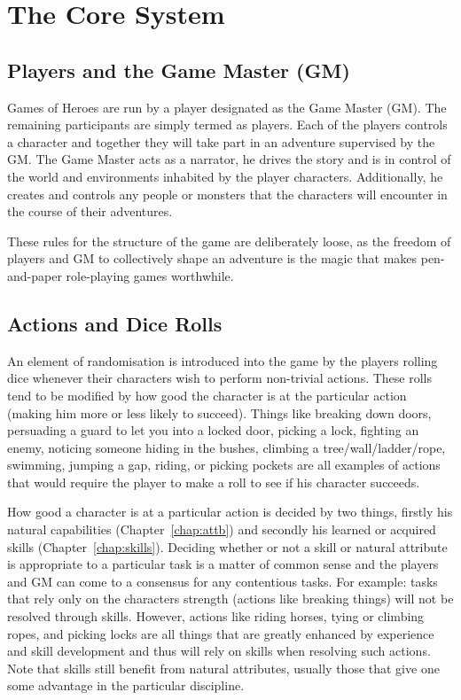 \documentclass[a4paper,10pt,oneside]{book}
\begin{document}
\section{The Core System}
\label{sec:base}

\subsection{Players and the Game Master (GM)}
Games of Heroes are run by a player designated as the Game Master (GM). The remaining participants are simply termed as players. Each of the players controls a character and together they will take part in an adventure supervised by the GM. The Game Master acts as a narrator, he drives the story and is in control of the world and environments inhabited by the player characters. Additionally, he creates and controls any people or monsters that the characters will encounter in the course of their adventures. 

These rules for the structure of the game are deliberately loose, as the freedom of players and GM to collectively shape an adventure is the magic that makes pen-and-paper role-playing games worthwhile.

\subsection{Actions and Dice Rolls}
An element of randomisation is introduced into the game by the players rolling dice whenever their characters wish to perform non-trivial actions. These rolls tend to be modified by how good the character is at the particular action (making him more or less likely to succeed). Things like breaking down doors, persuading a guard to let you into a locked door, picking a lock, fighting an enemy, noticing someone hiding in the bushes, climbing a tree/wall/ladder/rope, swimming, jumping a gap, riding, or picking pockets are all examples of actions that would require the player to make a roll to see if his character succeeds. 

How good a character is at a particular action is decided by two things, firstly his natural capabilities (Chapter~\ref{chap:attb}) and secondly his learned or acquired skills (Chapter~\ref{chap:skills}). Deciding whether or not a skill or natural attribute is appropriate to a particular task is a matter of common sense and the players and GM can come to a consensus for any contentious tasks. For example: tasks that rely only on the characters strength (actions like breaking things) will not be resolved through skills. However, actions like riding horses, tying or climbing ropes, and picking locks are all things that are greatly enhanced by experience and skill development and thus will rely on skills when resolving such actions. Note that skills still benefit from natural attributes, usually those that give one some advantage in the particular discipline. 
\end{document}
